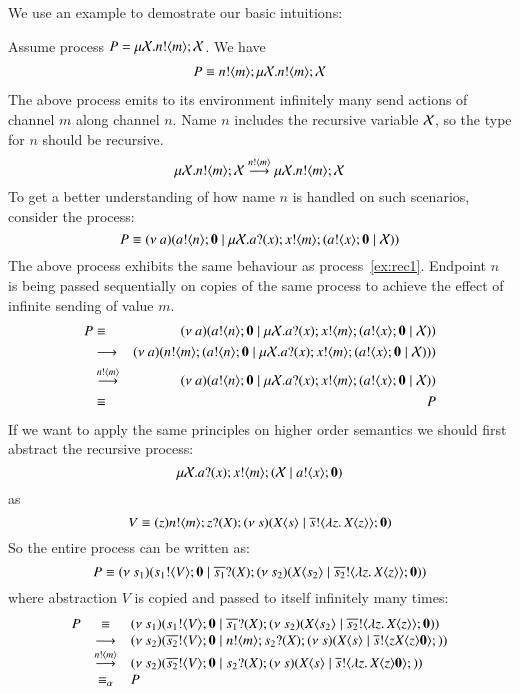 We use an example to demostrate our basic intuitions:
%
\begin{example}
	Assume process $P = \mu \mathcal{X}. n ! \langle m \rangle ; \mathcal{X}$. We have
%
	\begin{eqnarray}
		\label{ex:rec1}
		P \equiv n ! \langle m \rangle ; \mu \mathcal{X}. n ! \langle m \rangle ; \mathcal{X} 
	\end{eqnarray}
%
	\noi The above process emits to its environment infinitely many send actions of channel $m$ along channel $n$.
	Name $n$ includes the recursive
	variable $\mathcal{X}$, so the type for $n$ should be recursive.
%
	\[
		\mu \mathcal{X}. n ! \langle m \rangle ; \mathcal{X} \stackrel{n ! \langle m \rangle}{\longrightarrow} \mu \mathcal{X}. n ! \langle m \rangle ; \mathcal{X}
	\]
%
	To get a better understanding of how name $n$ is handled
	on such scenarios, consider the process:
	\[
		P \equiv (\nu\ a)(a ! \langle n \rangle ; \mathbf{0} \;|\; \mu \mathcal{X}. a ? (x) ; x ! \langle m \rangle ; (a ! \langle x \rangle ; \mathbf{0} \;|\; \mathcal{X}))
	\]
%
	\noi The above process exhibits the same behaviour as
	process~\ref{ex:rec1}.
	Endpoint $n$ is being passed sequentially on copies of the 
	same process to achieve the effect of infinite sending of value $m$.
%
	\begin{eqnarray*}
		P	&\equiv&	(\nu\ a)(a ! \langle n \rangle ; \mathbf{0} \;|\; \mu \mathcal{X}. a ? (x) ; x ! \langle m \rangle ; (a ! \langle x \rangle ; \mathbf{0} \;|\; \mathcal{X}))\\
			&\longrightarrow&		(\nu\ a)(n ! \langle m \rangle ; (a ! \langle n \rangle ; \mathbf{0} \;|\; \mu \mathcal{X}. a ? (x) ; x ! \langle m \rangle ; (a ! \langle x \rangle ; \mathbf{0} \;|\; \mathcal{X})))\\
			&\stackrel{n ! \langle m \rangle}{\longrightarrow}& (\nu\ a)(a ! \langle n \rangle ; \mathbf{0} \;|\; \mu \mathcal{X}. a ? (x) ; x ! \langle m \rangle ; (a ! \langle x \rangle ; \mathbf{0} \;|\; \mathcal{X}))\\
			&\equiv&	P
	\end{eqnarray*}
%
	\noi If we want to apply the same principles on higher order semantics we should first
	abstract the recursive process:
%
	\[
		\mu \mathcal{X}. a ? (x) ; x ! \langle m \rangle ; ( \mathcal{X} \;|\; a ! \langle x \rangle ; \mathbf{0})
	\]
%
	\noi as
%
	\[
		V \equiv (z) n ! \langle m \rangle ; z ? (X) ; (\nu\ s)(X\langle s \rangle \;|\; \overline{s} ! \langle \lambda z.\,X\langle z \rangle \rangle ; \mathbf{0})
	\]
%
	So the entire process can be written as:
	\[
		P \equiv (\nu\ s_1)(s_1 ! \langle V \rangle ; \mathbf{0} \;|\; \overline{s_1} ? (X) ; (\nu\ s_2)(X\langle s_2 \rangle \;|\; \overline{s_2} ! \langle \lambda z.\,X\langle z \rangle \rangle ; \mathbf{0}))	
	\]
%
	\noi where abstraction $V$ is copied and passed to itself
	infinitely many times:
	\[
		\begin{array}{rcl}
			P &\equiv& (\nu\ s_1)(s_1 ! \langle V \rangle ; \mathbf{0} \;|\; \overline{s_1} ? (X) ; (\nu\ s_2)(X\langle s_2 \rangle \;|\; \overline{s_2} ! \langle \lambda z.\,X\langle z \rangle \rangle ; \mathbf{0})) \\
			&\longrightarrow&
			(\nu\ s_2)(\overline{s_2} ! \langle V \rangle ; \mathbf{0} \;|\; n ! \langle m \rangle ; s_2 ? (X) ; (\nu\ s)(X\langle s \rangle \;|\; \overline{s} ! \langle {z}{X\langle z \rangle} \mathbf{0} \rangle ;))\\
			&\stackrel{n ! \langle m \rangle}{\longrightarrow}&
			(\nu\ s_2)(\overline{s_2} ! \langle V \rangle ; \mathbf{0} \;|\; s_2 ? (X) ; (\nu\ s)(X\langle s \rangle \;|\; \overline{s} ! \langle \lambda z.\,X\langle z \rangle \mathbf{0} \rangle ;))\\
			&\equiv_\alpha&
			P
		\end{array}
	\]
%


\end{example}
